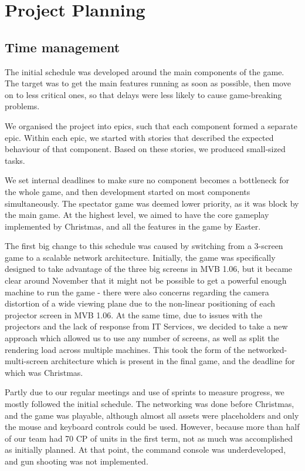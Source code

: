 \documentclass[a4paper,11pt]{article}
\begin{document}
\section{Project Planning}

\subsection{Time management}
The initial schedule was developed around the main components of the game. The target was to get the main features running as soon as possible, then move on to less critical ones, so that delays were less likely to cause game-breaking problems.

We organised the project into epics, such that each component formed a separate epic. Within each epic, we started with stories that described the expected behaviour of that component. Based on these stories, we produced small-sized tasks.

We set internal deadlines to make sure no component becomes a bottleneck for the whole game, and then development started on most components simultaneously. The spectator game was deemed lower priority, as it was block by the main game. At the highest level, we aimed to have the core gameplay implemented by Christmas, and all the features in the game by Easter.

The first big change to this schedule was caused by switching from a 3-screen game to a scalable network architecture. Initially, the game was specifically designed to take advantage of the three big screens in MVB 1.06, but it became clear around November that it might not be possible to get a powerful enough machine to run the game - there were also concerns regarding the camera distortion of a wide viewing plane due to the non-linear positioning of each projector screen in MVB 1.06. At the same time, due to issues with the projectors and the lack of response from IT Services, we decided to take a new approach which allowed us to use any number of screens, as well as split the rendering load across multiple machines. This took the form of the networked-multi-screen architecture which is present in the final game, and the deadline for which was Christmas.

Partly due to our regular meetings and use of sprints to measure progress, we mostly followed the initial schedule. The networking was done before Christmas, and the game was playable, although almost all assets were placeholders and only the mouse and keyboard controls could be used. However, because more than half of our team had 70 CP of units in the first term, not as much was accomplished as initially planned. At that point, the command console was underdeveloped, and gun shooting was not implemented.
\end{document}
